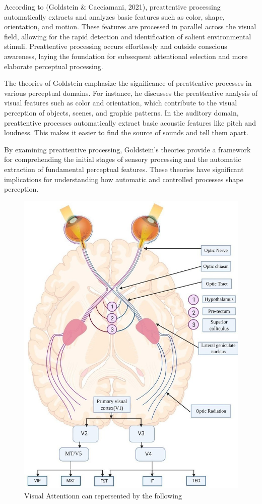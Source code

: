 \documentclass[print]{nuthesis}
\begin{document}
According to (Goldstein \& Cacciamani, 2021), preattentive processing automatically extracts and analyzes basic features such as color, shape, orientation, and motion.
These features are processed in parallel across the visual field, allowing for the rapid detection and identification of salient environmental stimuli.
Preattentive processing occurs effortlessly and outside conscious awareness, laying the foundation for subsequent attentional selection and more elaborate perceptual processing.

The theories of Goldstein emphasize the significance of preattentive processes in various perceptual domains.
For instance, he discusses the preattentive analysis of visual features such as color and orientation, which contribute to the visual perception of objects, scenes, and graphic patterns.
In the auditory domain, preattentive processes automatically extract basic acoustic features like pitch and loudness.
This makes it easier to find the source of sounds and tell them apart.

By examining preattentive processing, Goldstein's theories provide a framework for comprehending the initial stages of sensory processing and the automatic extraction of fundamental perceptual features.
These theories have significant implications for understanding how automatic and controlled processes shape perception.~

\begin{figure}

{\centering \includegraphics[width=0.45\linewidth]{figure/visual_system} 

}

\caption{Visual Attentionn can repersented by the following}\label{fig:visual}
\end{figure}
\end{document}
